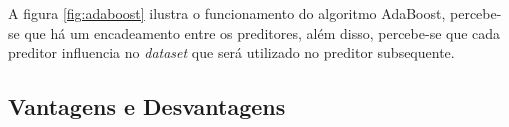 A figura \ref{fig:adaboost} ilustra o funcionamento do algoritmo AdaBoost, percebe-se que há um encadeamento entre os preditores, além disso, percebe-se que cada preditor influencia no \textit{dataset} que será utilizado no preditor subsequente.



\subsection{Vantagens e Desvantagens}